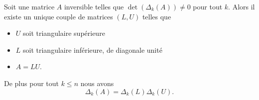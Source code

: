\begin{theorem}       \label{THOooUXKJooYaPhiu}
	Soit une matrice \( A\) inversible telles que \( \det(\Delta_k(A))\neq 0\) pour tout \( k\). Alors il existe un unique couple de matrices \( (L,U)\) telles que
	\begin{itemize}
		\item \( U\) soit triangulaire supérieure
		\item \( L\) soit triangulaire inférieure, de diagonale unité
		\item \( A=LU\).
	\end{itemize}
	De plus pour tout \( k\leq n\) nous avons
	\begin{equation}
		\Delta_k(A)=\Delta_k(L)\Delta_k(U).
	\end{equation}
\end{theorem}

